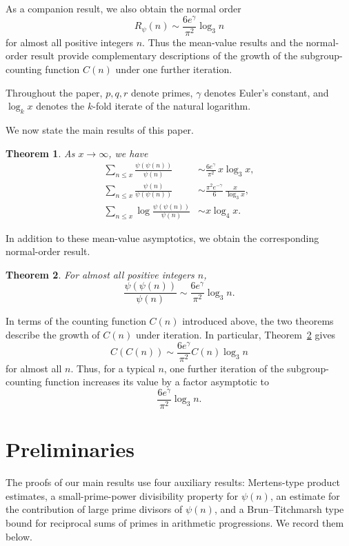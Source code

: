 \documentclass{article}
\newtheorem{theorem}{Theorem}[section]
\theoremstyle{remark}
\begin{document}
As a companion result, we also obtain the normal order
\[
R_\psi(n)
\sim
\frac{6e^\gamma}{\pi^2}\log_3 n
\]
for almost all positive integers \(n\). Thus the mean-value results and
the normal-order result provide complementary descriptions of the
growth of the subgroup-counting function \(C(n)\) under one further
iteration.

Throughout the paper, \(p,q,r\) denote primes, \(\gamma\) denotes
Euler's constant, and \(\log_k x\) denotes the \(k\)-fold iterate of
the natural logarithm.


We now state the main results of this paper.

\begin{theorem}\label{thm:mean-values}
As \(x\to\infty\), we have
\begin{align}
\sum_{n\le x}
\frac{\psi(\psi(n))}{\psi(n)}
&\sim
\frac{6e^\gamma}{\pi^2}\,x\log_3 x,
\label{eq:mean-psi}\\
\sum_{n\le x}
\frac{\psi(n)}{\psi(\psi(n))}
&\sim
\frac{\pi^2e^{-\gamma}}{6}\,
\frac{x}{\log_3 x},
\label{eq:mean-reciprocal-psi}\\
\sum_{n\le x}
\log\frac{\psi(\psi(n))}{\psi(n)}
&\sim
x\log_4 x.
\label{eq:log-mean-psi}
\end{align}
\end{theorem}

In addition to these mean-value asymptotics, we obtain the
corresponding normal-order result.

\begin{theorem}\label{thm:normal-order}
For almost all positive integers \(n\),
\[
\frac{\psi(\psi(n))}{\psi(n)}
\sim
\frac{6e^\gamma}{\pi^2}\log_3 n.
\]
\end{theorem}

In terms of the counting function \(C(n)\) introduced above, the two
theorems describe the growth of \(C(n)\) under iteration. In particular,
Theorem~\ref{thm:normal-order} gives
\[
C(C(n))
\sim
\frac{6e^\gamma}{\pi^2}C(n)\log_3 n
\]
for almost all \(n\). Thus, for a typical \(n\), one further iteration
of the subgroup-counting function increases its value by a factor
asymptotic to
\[
\frac{6e^\gamma}{\pi^2}\log_3 n.
\]


\section{\bf Preliminaries}
\bigskip
The proofs of our main results use four auxiliary results:
Mertens-type product estimates, a small-prime-power divisibility
property for \(\psi(n)\), an estimate for the contribution of large
prime divisors of \(\psi(n)\), and a Brun--Titchmarsh type bound for
reciprocal sums of primes in arithmetic progressions. We record them
below.
\end{document}
